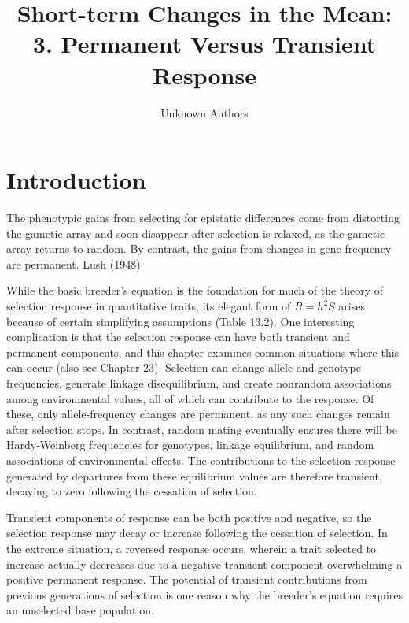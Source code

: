 \documentclass{article}
\title{Short-term Changes in the Mean:
3. Permanent Versus Transient Response}
\author{Unknown Authors}
\date{}
\begin{document}
\maketitle

\begin{abstract}

\end{abstract}

\section{Introduction}
The phenotypic gains from selecting for epistatic differences come from distorting the gametic array and soon disappear after selection is relaxed, as the gametic array returns to random. By contrast, the gains from changes in gene frequency are permanent. Lush (1948)

While the basic breeder’s equation is the foundation for much of the theory of selection response in quantitative traits, its elegant form of  $ R = h^{2}S $ arises because of certain simplifying assumptions (Table 13.2). One interesting complication is that the selection response can have both transient and permanent components, and this chapter examines common situations where this can occur (also see Chapter 23). Selection can change allele and genotype frequencies, generate linkage disequilibrium, and create nonrandom associations among environmental values, all of which can contribute to the response. Of these, only allele-frequency changes are permanent, as any such changes remain after selection stops. In contrast, random mating eventually ensures there will be Hardy-Weinberg frequencies for genotypes, linkage equilibrium, and random associations of environmental effects. The contributions to the selection response generated by departures from these equilibrium values are therefore transient, decaying to zero following the cessation of selection.

Transient components of response can be both positive and negative, so the selection response may decay or increase following the cessation of selection. In the extreme situation, a reversed response occurs, wherein a trait selected to increase actually decreases due to a negative transient component overwhelming a positive permanent response. The potential of transient contributions from previous generations of selection is one reason why the breeder's equation requires an unselected base population.
\end{document}
